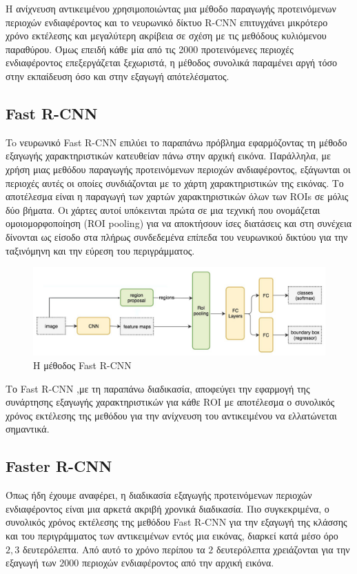 Η ανίχνευση αντικειμένου χρησιμοποιώντας μια μέθοδο παραγωγής προτεινόμενων περιοχών
ενδιαφέροντος και το νευρωνικό δίκτυο R-CNN επιτυγχάνει μικρότερο χρόνο εκτέλεσης
και μεγαλύτερη ακρίβεια σε σχέση με τις μεθόδους κυλιόμενου παραθύρου. Όμως επειδή
κάθε μία από τις 2000 προτεινόμενες περιοχές ενδιαφέροντος επεξεργάζεται ξεχωριστά,
η μέθοδος συνολικά παραμένει αργή τόσο στην εκπαίδευση όσο και στην εξαγωγή απότελέσματος.
\subsection{Fast R-CNN}\label{sec:fastrcnn}
To νευρωνικό Fast R-CNN επιλύει το παραπάνω πρόβλημα εφαρμόζοντας τη μέθοδο
εξαγωγής χαρακτηριστικών κατευθείαν πάνω στην αρχική εικόνα. Παράλληλα, με χρήση
μιας μεθόδου παραγωγής προτεινόμενων περιοχών ανδιαφέροντος, εξάγωνται οι περιοχές
αυτές οι οποίες συνδιάζονται με το χάρτη χαρακτηριστικών της εικόνας. Το αποτέλεσμα
είναι η παραγωγή των χαρτών χαρακτηριστικών όλων των ROIs σε μόλις δύο βήματα. Οι
χάρτες αυτοί υπόκεινται πρώτα σε μια τεχνική που ονομάζεται ομοιομορφοποίηση
(ROI pooling) για να αποκτήσουν ίσες διατάσεις και στη συνέχεια δίνονται ως είσοδο
στα πλήρως συνδεδεμένα επίπεδα του νευρωνικού δικτύου για την ταξινόμηνη και την
εύρεση του περιγράμματος.


\begin{figure}[htbp]
  \begin{center}
    \includegraphics[width=1.1\maxwidth]{../figures/fastrcnn2.png}
    \caption{Η μέθοδος Fast R-CNN\label{fig:fastrcnn}}
   \end{center}
\end{figure}

Το Fast R-CNN ,με τη παραπάνω διαδικασία, αποφεύγει
την εφαρμογή της συνάρτησης εξαγωγής χαρακτηριστικών για κάθε ROI με αποτέλεσμα
ο συνολικός χρόνος εκτέλεσης της μεθόδου για την ανίχνευση του αντικειμένου να
ελλατώνεται σημαντικά.
\subsection{Faster R-CNN}\label{sec:fasterrcnn}
Όπως ήδη έχουμε αναφέρει, η διαδικασία εξαγωγής προτεινόμενων περιοχών ενδιαφέροντος
είναι μια αρκετά ακριβή χρονικά διαδικασία. Πιο συγκεκριμένα, ο συνολικός χρόνος
εκτέλεσης της μεθόδου Fast R-CNN για την εξαγωγή της κλάσσης και του περιγράμματος
των αντικειμένων εντός μια εικόνας, διαρκεί κατά μέσο όρο $2,3$ δευτερόλεπτα. Από
αυτό το χρόνο περίπου τα $2$ δευτερόλεπτα χρειάζονται για την εξαγωγή των $2000$
περιοχών ενδιαφέροντος από την αρχική εικόνα.

